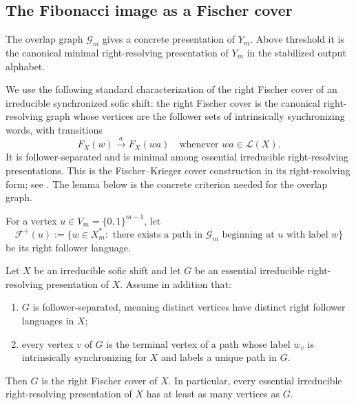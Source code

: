 \subsection{The Fibonacci image as a Fischer cover}

The overlap graph $\mathcal G_m$ gives a concrete presentation of $Y_m$. Above
threshold it is the canonical minimal right-resolving presentation of $Y_m$
in the stabilized output alphabet.

We use the following standard characterization of the right Fischer cover of
an irreducible synchronized sofic shift: the right Fischer cover is the
canonical right-resolving graph whose vertices are the follower sets of
intrinsically synchronizing words, with transitions
\[
F_X(w)\xrightarrow{a}F_X(wa)
\quad\text{whenever }wa\in\mathcal L(X).
\]
It is follower-separated and is minimal among essential irreducible
right-resolving presentations. This is the Fischer--Krieger cover
construction in its right-resolving form; see
\cite{Fischer1975,Krieger1984,Krieger1987,LindMarcus1995,Kitchens1998,BoyleKitchensMarcus1985,Johansen2011}.
The lemma below is the concrete criterion needed for the overlap graph.

For a vertex $u\in V_m=\{0,1\}^{m-1}$, let
\[
\mathcal F^+(u):=
\{w\in X_m^*:\text{ there exists a path in }\mathcal G_m
\text{ beginning at }u\text{ with label }w\}
\]
be its right follower language.

\begin{lemma}\label{lem:fischer-cover-criterion}
Let $X$ be an irreducible sofic shift and let $G$ be an essential irreducible
right-resolving presentation of $X$. Assume in addition that:
\begin{enumerate}[label=(\roman*),leftmargin=*,itemsep=2pt]
  \item $G$ is follower-separated, meaning distinct vertices have distinct
  right follower languages in $X$;
  \item every vertex $v$ of $G$ is the terminal vertex of a path whose label
  $w_v$ is intrinsically synchronizing for $X$ and labels a unique path in
  $G$.
\end{enumerate}
Then $G$ is the right Fischer cover of $X$. In particular, every essential
irreducible right-resolving presentation of $X$ has at least as many vertices
as $G$.
\end{lemma}

